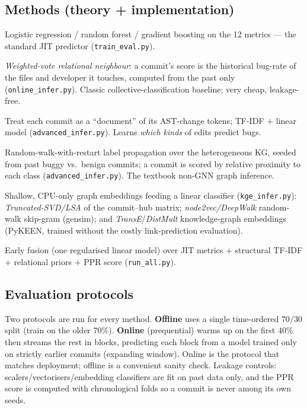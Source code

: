 \documentclass[11pt,a4paper]{article}
\begin{document}
	\subsection{Methods (theory + implementation)}
	\begin{description}[nosep,leftmargin=1.4em]
		\item[JIT-metrics baseline.] Logistic regression / random forest / gradient
		boosting on the 12 metrics --- the standard JIT predictor
		(\texttt{train\_eval.py}).
		\item[wvRN / relational priors.] \emph{Weighted-vote relational neighbour}: a
		commit's score is the historical bug-rate of the files and developer it
		touches, computed from the past only (\texttt{online\_infer.py}). Classic
		collective-classification baseline; very cheap, leakage-free.
		\item[Structural TF-IDF.] Treat each commit as a ``document'' of its AST-change
		tokens; TF-IDF $+$ linear model (\texttt{advanced\_infer.py}). Learns
		\emph{which kinds} of edits predict bugs.
		\item[Personalized PageRank (PPR).] Random-walk-with-restart label propagation
		over the heterogeneous KG, seeded from past buggy vs.\ benign commits;
		a commit is scored by relative proximity to each class
		(\texttt{advanced\_infer.py}). The textbook non-GNN graph inference.
		\item[KG embeddings.] Shallow, CPU-only graph embeddings feeding a linear
		classifier (\texttt{kge\_infer.py}): \emph{Truncated-SVD/LSA} of the
		commit--hub matrix; \emph{node2vec/DeepWalk} random-walk skip-gram
		(gensim); and \emph{TransE}/\emph{DistMult} knowledge-graph embeddings
		(PyKEEN, trained without the costly link-prediction evaluation).
		\item[Fusion.] Early fusion (one regularised linear model) over JIT metrics
		$+$ structural TF-IDF $+$ relational priors $+$ PPR score
		(\texttt{run\_all.py}).
	\end{description}
	
	\subsection{Evaluation protocols}
	Two protocols are run for every method. \textbf{Offline} uses a single
	time-ordered $70/30$ split (train on the older $70\%$). \textbf{Online}
	(prequential) warms up on the first $40\%$ then streams the rest in blocks,
	predicting each block from a model trained only on strictly earlier commits
	(expanding window). Online is the protocol that matches deployment; offline is a
	convenient sanity check. Leakage controls: scalers/vectorisers/embedding
	classifiers are fit on past data only, and the PPR score is computed with
	chronological folds so a commit is never among its own seeds.
	
\end{document}
